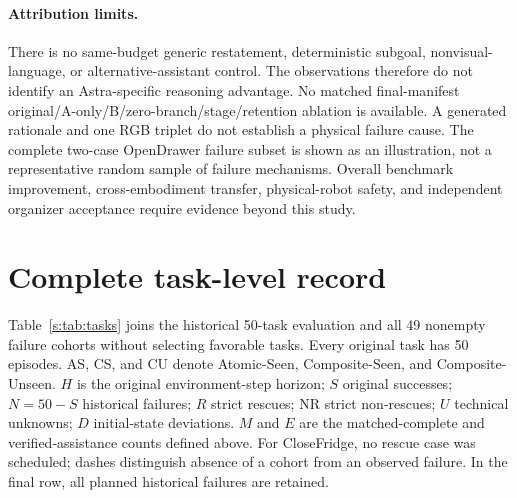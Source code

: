 \paragraph{Attribution limits.}
There is no same-budget generic restatement, deterministic subgoal, nonvisual-language, or alternative-assistant control. The observations therefore do not identify an Astra-specific reasoning advantage. No matched final-manifest original/A-only/B/zero-branch/stage/retention ablation is available. A generated rationale and one RGB triplet do not establish a physical failure cause. The complete two-case OpenDrawer failure subset is shown as an illustration, not a representative random sample of failure mechanisms. Overall benchmark improvement, cross-embodiment transfer, physical-robot safety, and independent organizer acceptance require evidence beyond this study.

\clearpage
\onecolumn
\section{Complete task-level record}
\label{s:tasks}
Table~\ref{s:tab:tasks} joins the historical 50-task evaluation and all 49 nonempty failure cohorts without selecting favorable tasks. Every original task has 50 episodes. AS, CS, and CU denote Atomic-Seen, Composite-Seen, and Composite-Unseen. $H$ is the original environment-step horizon; $S$ original successes; $N=50-S$ historical failures; $R$ strict rescues; NR strict non-rescues; $U$ technical unknowns; $D$ initial-state deviations. $M$ and $E$ are the matched-complete and verified-assistance counts defined above. For CloseFridge, no rescue case was scheduled; dashes distinguish absence of a cohort from an observed failure. In the final row, all planned historical failures are retained.

